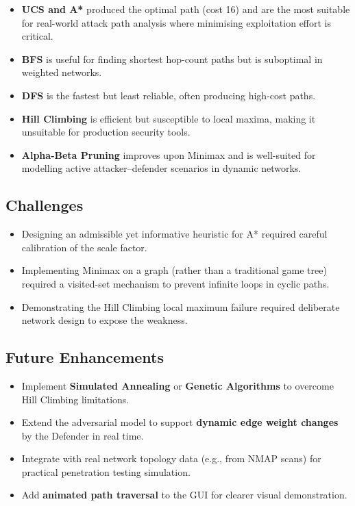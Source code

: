 \documentclass[12pt,a4paper]{article}
\begin{document}
\begin{itemize}
    \item \textbf{UCS and A*} produced the optimal path (cost 16) and are the most
    suitable for real-world attack path analysis where minimising exploitation effort is
    critical.
    \item \textbf{BFS} is useful for finding shortest hop-count paths but is suboptimal
    in weighted networks.
    \item \textbf{DFS} is the fastest but least reliable, often producing high-cost paths.
    \item \textbf{Hill Climbing} is efficient but susceptible to local maxima, making it
    unsuitable for production security tools.
    \item \textbf{Alpha-Beta Pruning} improves upon Minimax and is well-suited for
    modelling active attacker--defender scenarios in dynamic networks.
\end{itemize}

\subsection{Challenges}
\begin{itemize}
    \item Designing an admissible yet informative heuristic for A* required careful
    calibration of the scale factor.
    \item Implementing Minimax on a graph (rather than a traditional game tree) required
    a visited-set mechanism to prevent infinite loops in cyclic paths.
    \item Demonstrating the Hill Climbing local maximum failure required deliberate
    network design to expose the weakness.
\end{itemize}

\subsection{Future Enhancements}
\begin{itemize}
    \item Implement \textbf{Simulated Annealing} or \textbf{Genetic Algorithms} to overcome Hill Climbing limitations.
    \item Extend the adversarial model to support \textbf{dynamic edge weight changes} by the Defender in real time.
    \item Integrate with real network topology data (e.g., from NMAP scans) for practical penetration testing simulation.
    \item Add \textbf{animated path traversal} to the GUI for clearer visual demonstration.
\end{itemize}
\end{document}
